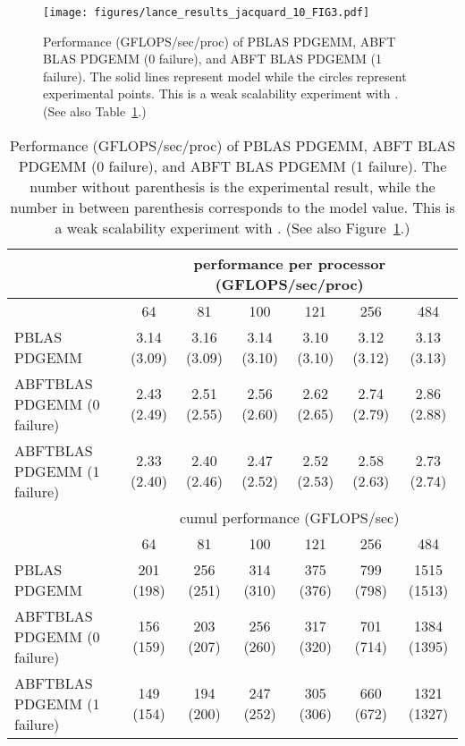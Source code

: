 \documentclass[pdftex,11pt]{article}
\begin{document}
\begin{figure}
  \begin{center}
    \texttt{[image: figures/lance\_results\_jacquard\_10\_FIG3.pdf]}
  \end{center}
  \color{DodgerBlue4}
  \caption{\label{fig:perf02} \color{black} Performance
    (GFLOPS/sec/proc) of PBLAS PDGEMM, ABFT BLAS PDGEMM (0 failure),
    and ABFT BLAS PDGEMM (1 failure).  The solid lines represent model
    while the circles represent experimental points.  This is a weak
    scalability experiment with .  (See also
    Table~\ref{tab:perf02}.)  }
\end{figure}

\begin{table}
  \begin{center}
    \small
    \begin{tabular}{|l||c|c|c|c|c|c|}
      \hline
      & \multicolumn{6}{|c|}{performance per processor (GFLOPS/sec/proc)}\\
      \hline
      &   64        &   81        &  100        &  121        &  256        &  484        \\
      \hline
      PBLAS PDGEMM                & 3.14 (3.09) & 3.16 (3.09) & 3.14 (3.10) & 3.10 (3.10) & 3.12 (3.12) & 3.13 (3.13) \\
      ABFTBLAS PDGEMM (0 failure) & 2.43 (2.49) & 2.51 (2.55) & 2.56 (2.60) & 2.62 (2.65) & 2.74 (2.79) & 2.86 (2.88) \\
      ABFTBLAS PDGEMM (1 failure) & 2.33 (2.40) & 2.40 (2.46) & 2.47 (2.52) & 2.52 (2.53) & 2.58 (2.63) & 2.73 (2.74) \\
      \hline
      & \multicolumn{6}{|c|}{cumul performance (GFLOPS/sec)}\\
      \hline
      &   64        &   81        &  100        &  121        &  256        &  484        \\
      \hline
      PBLAS PDGEMM                &  201 (198)  &  256 (251)  &  314 (310)  &  375 (376)  &  799 (798)  & 1515 (1513) \\
      ABFTBLAS PDGEMM (0 failure) &  156 (159)  &  203 (207)  &  256 (260)  &  317 (320)  &  701 (714)  & 1384 (1395) \\
      ABFTBLAS PDGEMM (1 failure) &  149 (154)  &  194 (200)  &  247 (252)  &  305 (306)  &  660 (672)  & 1321 (1327) \\
      \hline
    \end{tabular}
    \normalsize
  \end{center}
  \color{DodgerBlue4}
  \caption{\label{tab:perf02}
    \color{black}
    Performance (GFLOPS/sec/proc) of PBLAS PDGEMM, ABFT BLAS PDGEMM (0 failure), 
    and ABFT BLAS PDGEMM (1 failure). The number without parenthesis is the experimental result, 
    while the number in between parenthesis corresponds to the model value.
    This is a weak scalability experiment with .
    (See also Figure~\ref{fig:perf02}.)
  }
\end{table}
\end{document}
